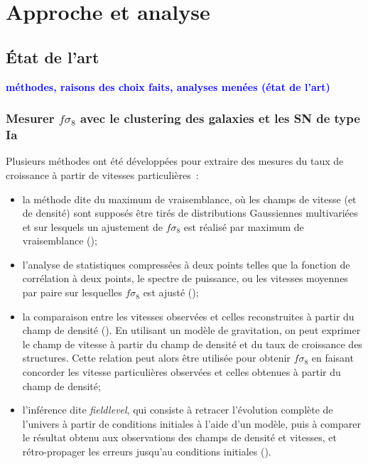 \documentclass{book}
\newcommand{\consignes}[1]{{\textcolor{blue}{\bf \large #1}}}
\begin{document}
\chapter{Approche et analyse}

\section{État de l'art}
\consignes{méthodes, raisons des choix faits, analyses menées (état de l’art)}

\subsection{Mesurer $f\sigma_8$ avec le clustering des galaxies et les SN de type Ia}
\label{sec:art}
 Plusieurs méthodes ont été développées pour extraire des mesures du taux de croissance à partir de vitesses particulières~:
 \begin{itemize}
     \item la méthode dite du maximum de vraisemblance, où les champs de vitesse (et de densité) sont supposés être tirés de distributions Gaussiennes multivariées et sur lesquels un ajustement de $f\sigma_8$ est réalisé par maximum de vraisemblance (\cite{johnson_6df_2014, huterer_testing_2017, howlett_2mtf_2017, adams_joint_2020, lai_using_2022, carreres_growth-rate_2023});
     \item l'analyse de statistiques compressées à deux points telles que la fonction de corrélation à deux points, le spectre de puissance, ou les vitesses moyennes par paire sur lesquelles $f\sigma_8$ est ajusté (\cite{nusser_velocity-density_2017, dupuy_estimation_2019, qin_redshift_2019, turner_local_2023});
     \item la comparaison entre les vitesses observées et celles reconstruites à partir du champ de densité (\cite{davis_effect_2011, carrick_cosmological_2015, boruah_cosmic_2020, said_joint_2020, stahl_peculiar-velocity_2021}). En utilisant un modèle de gravitation, on peut exprimer le champ de vitesse à partir du champ de densité et du taux de croissance des structures. Cette relation peut alors être utilisée pour obtenir $f\sigma_8$ en faisant concorder les vitesse particulières observées et celles obtenues à partir du champ de densité;
     \item l'inférence dite \textit{fieldlevel}, qui consiste à retracer l'évolution complète de l'univers à partir de conditions initiales à l'aide d'un modèle, puis à comparer le résultat obtenu aux observations des champs de densité et vitesses, et rétro-propager les erreurs jusqu'au conditions initiales (\cite{boruah_bayesian_2022, prideaux-ghee_field-based_2023}). 
\end{itemize}
\end{document}
